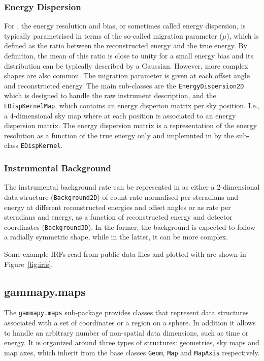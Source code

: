 \documentclass[traditabstract, longauth]{aa}
\newcommand{\code}[1]{\texttt{#1}}
\begin{document}
{\subsubsection{Energy Dispersion}
For \iacts, the energy resolution and bias, or sometimes called energy dispersion,
is typically parametrised in terms of the so-called
migration parameter ($\mu$), which is defined as the ratio between the
reconstructed energy and the true energy. By definition, the mean of this ratio is
close to unity for a small energy bias and its distribution can 
be typically described by a Gaussian. However, more complex
shapes are also common. The migration parameter is given at each offset angle and
reconstructed energy. The main sub-classes are the \code{EnergyDispersion2D} which is
designed to handle the raw instrument description, and the \code{EDispKernelMap},
which contains an energy disperion matrix per sky position. I.e., a 4-dimensional
sky map where at each position is associated to an energy dispersion matrix.
The energy dispersion matrix is a representation of the energy resolution
as a function of the true energy only and implemnted in \gammapy
by the sub-class \code{EDispKernel}.

\subsubsection{Instrumental Background}
The instrumental background rate can be represented in \gammapy as either a 2-dimensional
data structure (\code{Background2D}) of count rate normalised per steradians and energy at different
reconstructed energies and offset angles or as rate per steradians and energy, as a
function of reconstructed energy and detector coordinates (\code{Background3D}).
In the former, the background is expected to follow a radially symmetric shape,
while in the latter, it can be more complex.

Some example IRFs read from public data files and plotted with \gammapy are shown in Figure~\ref{fig:irfs}.

\subsection{gammapy.maps}
\label{ssec:gammapy-maps}
The \code{gammapy.maps} sub-package provides classes that represent data
structures associated with a set of coordinates or a region on a sphere. In
addition it allows to handle an arbitrary number of non-spatial data
dimensions, such as time or energy. It is organized around three types of
structures: geometries, sky maps and map axes, which inherit from the base
classes \code{Geom}, \code{Map} and \code{MapAxis} respectively.

}
\end{document}

